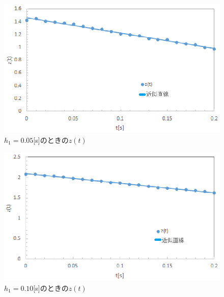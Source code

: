 \documentclass[11pt,a4paper]{jsarticle}
\begin{document}
\begin{figure}[htb]
 \begin{center}
  \includegraphics[scale = 1]{./picture/graph2_re2.eps}
 \end{center}
 \caption{$h_1 = 0.05$[s]のときの$z(t)$}
\end{figure}

\newpage
\thispagestyle{fancy}
\cfoot{}

\begin{figure}[htb]
 \begin{center}
  \includegraphics[scale = 1]{./picture/graph3_re2.eps}
 \end{center}
 \caption{$h_1 = 0.10$[s]のときの$z(t)$}
\end{figure}
\end{document}
